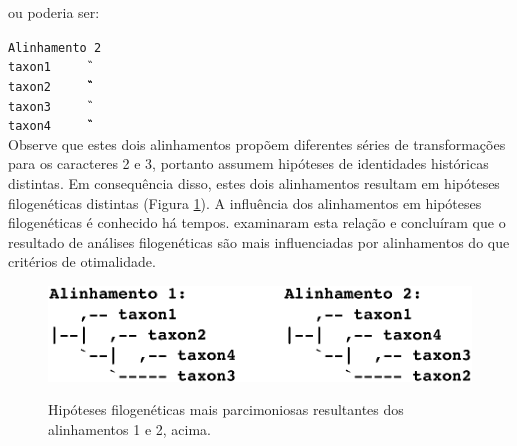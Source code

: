 \begin{refsection}
ou poderia ser:

\texttt{Alinhamento 2}\\
\indent\indent\indent\indent\indent\indent\indent\texttt{taxon1~~~~~\T\gap\T\G\gap\C\A}\\
\indent\indent\indent\indent\indent\indent\indent\texttt{taxon2~~~~~\T\G\G\G\C\C\A}\\
\indent\indent\indent\indent\indent\indent\indent\texttt{taxon3~~~~~\T\G\gap\gap\C\A\A}\\
\indent\indent\indent\indent\indent\indent\indent\texttt{taxon4~~~~~\T\gap\G\G\C\T\A}\\

Observe que estes dois alinhamentos propõem diferentes séries de transformações para os caracteres 2 e 3, portanto assumem hipóteses de identidades históricas \parencite[senso][]{Grant_and_Kluge_2004} distintas. Em consequência disso, estes dois alinhamentos resultam em hipóteses filogenéticas distintas (Figura \ref{tut8:fig:alinhamentos_examples}). A influência dos alinhamentos em hipóteses filogenéticas é conhecido há tempos. \textcite{Morrison_and_Ellis_1997} examinaram esta relação e concluíram que o resultado de análises filogenéticas são mais influenciadas por alinhamentos do que critérios de otimalidade.

  \begin{figure}[H]
      {\includegraphics[scale=0.9]{figures/tut8/alinhamentos_examples.eps}}
	{\caption[Consequência de alinhamentos em topologias]{Hipóteses filogenéticas mais parcimoniosas resultantes dos alinhamentos 1 e 2, acima.}\label{tut8:fig:alinhamentos_examples}}
  \end{figure}



\end{refsection}
